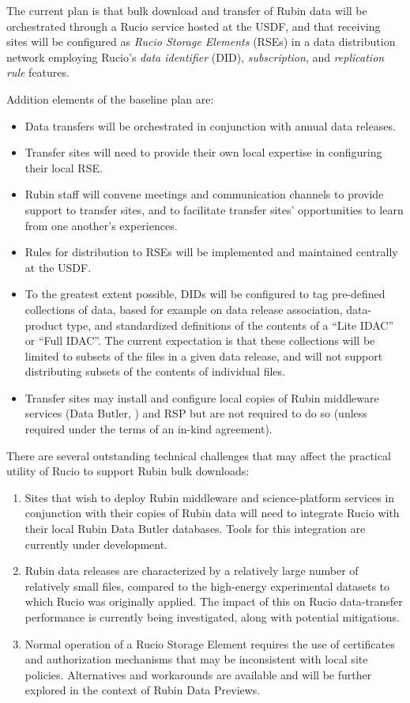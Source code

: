 The current plan is that bulk download and transfer of Rubin data will be orchestrated through a Rucio service hosted at the USDF, and that receiving sites will be configured as \textit{Rucio Storage Elements} (RSEs) in a data distribution network employing Rucio's \textit{data identifier} (DID), \textit{subscription}, and \textit{replication rule} features.

Addition elements of the baseline plan are:
\begin{itemize}
\item Data transfers will be orchestrated in conjunction with annual data releases.
\item Transfer sites will need to provide their own local expertise in configuring their local RSE.
\item Rubin staff will convene meetings and communication channels to provide support to transfer sites, and to facilitate transfer sites' opportunities to learn from one another's experiences.
\item Rules for distribution to RSEs will be implemented and maintained centrally at the USDF.
\item To the greatest extent possible, DIDs will be configured to tag pre-defined collections of data, based for example on data release association, data-product type, and standardized definitions of the contents of a ``Lite IDAC'' or ``Full IDAC''. The current expectation is that these collections will be limited to subsets of the files in a given data release, and will not support distributing subsets of the contents of individual files.
\item Transfer sites may install and configure local copies of Rubin middleware services (Data Butler, ) and RSP but are not required to do so (unless required under the terms of an in-kind agreement).
\end{itemize}

There are several outstanding technical challenges that may affect the practical utility of Rucio to support Rubin bulk downloads:
\begin{enumerate}
\item Sites that wish to deploy Rubin middleware and science-platform services in conjunction with their copies of Rubin data will need to integrate Rucio with their local Rubin Data Butler databases. Tools for this integration are currently under development.
\item Rubin data releases are characterized by a relatively large number of relatively small files, compared to the high-energy experimental datasets to which Rucio was originally applied. The impact of this on Rucio data-transfer performance is currently being investigated, along with potential mitigations.
\item Normal operation of a Rucio Storage Element requires the use of certificates and authorization mechanisms that may be inconsistent with local site policies. Alternatives and workarounds are available and will be further explored in the context of Rubin Data Previews.
\end{enumerate}

